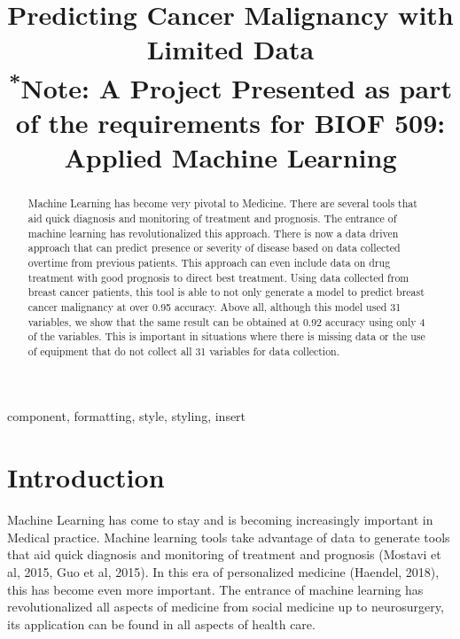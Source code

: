 \documentclass[conference]{IEEEtran}
\begin{document}
\title{Predicting Cancer Malignancy with Limited Data\\
{\footnotesize \textsuperscript{*}Note: A Project Presented as part of the requirements for BIOF 509: Applied Machine Learning}
}

\author{

}

\maketitle

\begin{abstract}
Machine Learning has become very pivotal to Medicine. There are several tools that aid quick diagnosis and monitoring of treatment and prognosis. The entrance of machine learning has revolutionalized this approach. There is now a data driven approach that can predict presence or severity of disease based on data collected overtime from previous patients. This approach can even include data on drug treatment with good prognosis to direct best treatment. Using data collected from breast cancer patients, this tool is able to not only generate a model to predict breast cancer malignancy at over 0.95 accuracy. Above all, although this model used 31 variables, we show that the same result can be obtained at 0.92 accuracy using only 4 of the variables. This is important in situations where there is missing data or the use of equipment that do not collect all 31 variables for data collection. 
\end{abstract}

\begin{IEEEkeywords}
component, formatting, style, styling, insert
\end{IEEEkeywords}

\section{Introduction}
Machine Learning has come to stay and is becoming increasingly important in Medical practice. Machine learning tools take advantage of data to generate tools that aid quick diagnosis and monitoring of treatment and prognosis (Mostavi et al, 2015, Guo et al, 2015). In this era of personalized medicine (Haendel, 2018), this has become even more important. The entrance of machine learning has revolutionalized all aspects of medicine from social medicine up to neurosurgery, its application can be found in all aspects of health care. 
\end{document}
